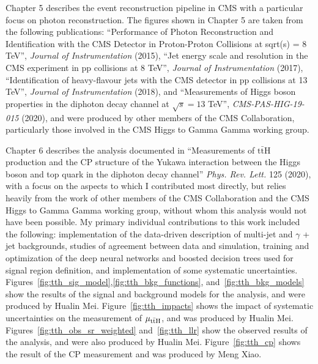 \begin{frontmatter}
\begin{acknowledgements}
    Chapter 5 describes the event reconstruction pipeline in CMS with a particular focus on photon reconstruction.
    The figures shown in Chapter 5 are taken from the following publications: ``Performance of Photon Reconstruction and Identification with the CMS Detector in Proton-Proton Collisions at sqrt(s) = 8 TeV'', \emph{Journal of Instrumentation} (2015), ``Jet energy scale and resolution in the CMS experiment in pp collisions at 8 TeV'', \emph{Journal of Instrumentation} (2017), ``Identification of heavy-flavour jets with the CMS detector in pp collisions at 13 TeV'', \emph{Journal of Instrumentation} (2018), and ``Measurements of Higgs boson properties in the diphoton decay channel at $\sqrt{s} = 13$ TeV'', \emph{CMS-PAS-HIG-19-015} (2020), and were produced by other members of the CMS Collaboration, particularly those involved in the CMS Higgs to Gamma Gamma working group.

    Chapter 6 describes the \ttH analysis documented in ``Measurements of $\mathrm{t\bar{t}}$H production and the CP structure of the Yukawa interaction between the Higgs boson and top quark in the diphoton decay channel'' \emph{Phys. Rev. Lett.} 125 (2020), with a focus on the aspects to which I contributed most directly, but relies heavily from the work of other members of the CMS Collaboration and the CMS Higgs to Gamma Gamma working group, without whom this analysis would not have been possible.
    My primary individual contributions to this work included the following: implementation of the data-driven description of multi-jet and $\gamma$ + jet backgrounds, studies of agreement between data and simulation, training and optimization of the deep neural networks and boosted decision trees used for signal region definition, and implementation of some systematic uncertainties. 
    Figures~\ref{fig:tth_sig_model},\ref{fig:tth_bkg_functions}, and~\ref{fig:tth_bkg_models} show the results of the signal and background models for the \ttH analysis, and were produced by Hualin Mei.
    Figure~\ref{fig:tth_impacts} shows the impact of systematic uncertainties on the measurement of $\mu_{\mathrm{t\bar{t}H}}$, and was produced by Hualin Mei.
    Figures~\ref{fig:tth_obs_sr_weighted} and~\ref{fig:tth_llr} show the observed results of the \ttH analysis, and were also produced by Hualin Mei.
    Figure~\ref{fig:tth_cp} shows the result of the \ttH CP measurement and was produced by Meng Xiao.
\end{acknowledgements}



\end{frontmatter}
